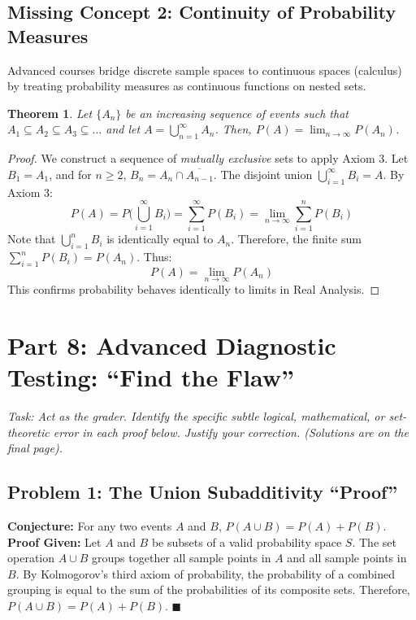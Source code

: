 \documentclass[12pt]{article}
\newtheorem{theorem}{Theorem}[section]
\begin{document}
\subsection{Missing Concept 2: Continuity of Probability Measures}
Advanced courses bridge discrete sample spaces to continuous spaces (calculus) by treating probability measures as continuous functions on nested sets. 
\begin{theorem}
Let $\{A_n\}$ be an increasing sequence of events such that $A_1 \subseteq A_2 \subseteq A_3 \subseteq \dots$ and let $A = \bigcup_{n=1}^\infty A_n$. Then, $P(A) = \lim_{n \to \infty} P(A_n)$.
\end{theorem}
\begin{proof}
We construct a sequence of \textit{mutually exclusive} sets to apply Axiom 3. Let $B_1 = A_1$, and for $n \geq 2$, $B_n = A_n \cap \overline{A_{n-1}}$. The disjoint union $\bigcup_{i=1}^\infty B_i = A$.
By Axiom 3:
\[ P(A) = P\Big( \bigcup_{i=1}^\infty B_i \Big) = \sum_{i=1}^\infty P(B_i) = \lim_{n \to \infty} \sum_{i=1}^n P(B_i) \]
Note that $\bigcup_{i=1}^n B_i$ is identically equal to $A_n$. Therefore, the finite sum $\sum_{i=1}^n P(B_i) = P(A_n)$. Thus:
\[ P(A) = \lim_{n \to \infty} P(A_n) \]
This confirms probability behaves identically to limits in Real Analysis.
\end{proof}

\newpage
\section{Part 8: Advanced Diagnostic Testing: ``Find the Flaw''}
\textit{Task: Act as the grader. Identify the specific subtle logical, mathematical, or set-theoretic error in each proof below. Justify your correction. (Solutions are on the final page).}

\subsection*{Problem 1: The Union Subadditivity ``Proof''}
\textbf{Conjecture:} For any two events $A$ and $B$, $P(A \cup B) = P(A) + P(B)$. \\
\textbf{Proof Given:} Let $A$ and $B$ be subsets of a valid probability space $S$. The set operation $A \cup B$ groups together all sample points in $A$ and all sample points in $B$. By Kolmogorov's third axiom of probability, the probability of a combined grouping is equal to the sum of the probabilities of its composite sets. Therefore, $P(A \cup B) = P(A) + P(B)$. $\blacksquare$
\end{document}
